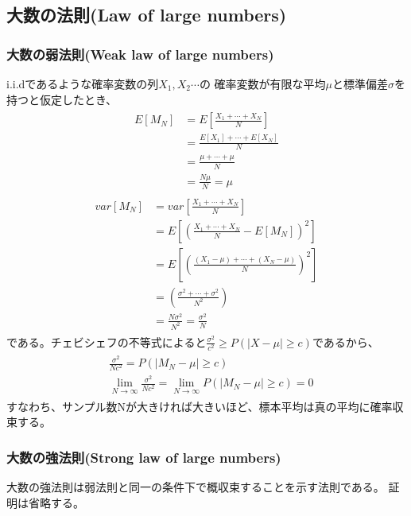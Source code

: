 \documentclass[a4j]{jarticle}
\begin{document}
\subsection{大数の法則(Law of large numbers)}
\subsubsection{大数の弱法則(Weak law of large numbers)}
i.i.dであるような確率変数の列$X_{1}, X_{2} \cdots$の
確率変数が有限な平均$\mu$と標準偏差$\sigma$を持つと仮定したとき、
\begin{align}
    \begin{aligned}
    E[M_{N}]&=E[\frac{X_{1} + \cdots + X_{N}}{N}] \\
    &=\frac{E[X_{1}] + \cdots + E[X_{N}]}{N} \\
    &=\frac{\mu + \cdots + \mu}{N} \\
    &=\frac{N\mu}{N}=\mu
    \end{aligned}  
\end{align}
\begin{align}
    \begin{aligned}
    var[M_{N}]&=var[\frac{X_{1} + \cdots + X_{N}}{N}] \\
    &=E[(\frac{X_{1} + \cdots + X_{N}}{N} - E[M_{N}])^2] \\
    &=E[(\frac{(X_{1} - \mu) + \cdots + (X_{N} - \mu)}{N})^2] \\
    &=(\frac{\sigma^2 + \cdots + \sigma^2}{N^2}) \\
    &=\frac{N\sigma^2}{N^2}=\frac{\sigma^2}{N}
    \end{aligned}  
\end{align}
である。チェビシェフの不等式によると$\frac{\sigma^2}{c^2} \geq P(|X - \mu| \geq c)$であるから、
\begin{align}
    \begin{aligned}
    &\frac{\sigma^2}{Nc^2}=P(|M_{N}-\mu| \geq c) \\
    &\lim_{N \to \infty}\frac{\sigma^2}{Nc^2}=\lim_{N \to \infty}P(|M_{N}-\mu| \geq c)=0
    \end{aligned}  
\end{align}
すなわち、サンプル数Nが大きければ大きいほど、標本平均は真の平均に確率収束する。

\subsubsection{大数の強法則(Strong law of large numbers)}
大数の強法則は弱法則と同一の条件下で概収束することを示す法則である。
証明は省略する。
\end{document}
